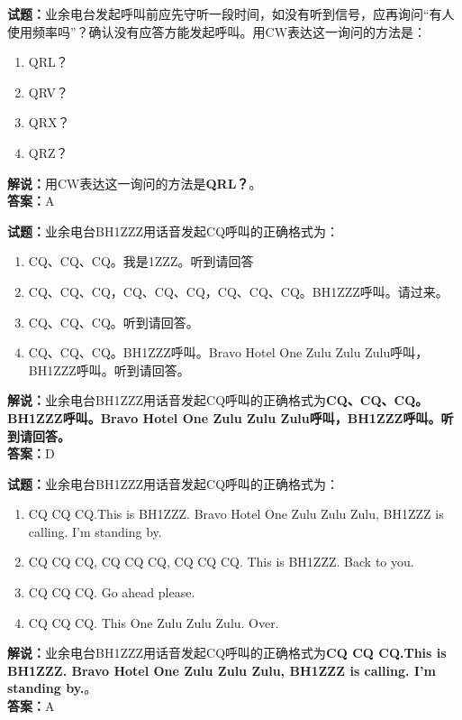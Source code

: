 \documentclass{ctexbook}
\begin{document}
\noindent\textbf{试题：}业余电台发起呼叫前应先守听一段时间，如没有听到信号，应再询问“有人使用频率吗”？确认没有应答方能发起呼叫。用CW表达这一询问的方法是：
\begin{enumerate}[leftmargin=3em]
\item QRL？
\item QRV？
\item QRX？
\item QRZ？
\end{enumerate}
\noindent\textbf{解说：}用CW表达这一询问的方法是\textbf{QRL？}。\\\noindent\textbf{答案：}A

\bigskip




\noindent\textbf{试题：}业余电台BH1ZZZ用话音发起CQ呼叫的正确格式为：
\begin{enumerate}[leftmargin=3em]
\item CQ、CQ、CQ。我是1ZZZ。听到请回答
\item CQ、CQ、CQ，CQ、CQ、CQ，CQ、CQ、CQ。BH1ZZZ呼叫。请过来。
\item CQ、CQ、CQ。听到请回答。
\item CQ、CQ、CQ。BH1ZZZ呼叫。Bravo Hotel One Zulu Zulu Zulu呼叫，BH1ZZZ呼叫。听到请回答。
\end{enumerate}
\noindent\textbf{解说：}业余电台BH1ZZZ用话音发起CQ呼叫的正确格式为\textbf{CQ、CQ、CQ。BH1ZZZ呼叫。Bravo Hotel One Zulu Zulu Zulu呼叫，BH1ZZZ呼叫。听到请回答。}\\\noindent\textbf{答案：}D

\bigskip




\noindent\textbf{试题：}业余电台BH1ZZZ用话音发起CQ呼叫的正确格式为：
\begin{enumerate}[leftmargin=3em]
\item CQ CQ CQ.This is BH1ZZZ. Bravo Hotel One Zulu Zulu Zulu, BH1ZZZ is calling. I’m standing by.
\item CQ CQ CQ, CQ CQ CQ, CQ CQ CQ. This is BH1ZZZ. Back to you.
\item CQ CQ CQ. Go ahead please.
\item CQ CQ CQ. This One Zulu Zulu Zulu. Over.
\end{enumerate}
\noindent\textbf{解说：}业余电台BH1ZZZ用话音发起CQ呼叫的正确格式为\textbf{CQ CQ CQ.This is BH1ZZZ. Bravo Hotel One Zulu Zulu Zulu, BH1ZZZ is calling. I’m standing by.}。\\\noindent\textbf{答案：}A

\bigskip
\end{document}
